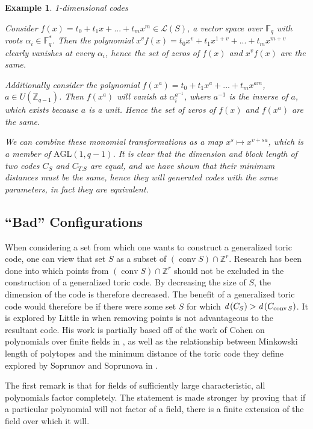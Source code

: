 \documentclass[12pt]{amsart}
\theoremstyle{plain}
\newtheorem{example}[Th]{Example}
\newcommand{\Int}{\mathbb{Z}}
\DeclareMathOperator{\Convex}{conv}
\newcommand{\dist}[1]{\mathrm{\emph{d}}\left(#1\right)}
\begin{document}
\begin{example}1-dimensional codes

Consider $f(x) = t_0 + t_1x + ... + t_m x^m \in \mathscr{L}(S)$, a vector space over $\mathbb{F}_q$ with roots $\alpha_i \in \mathbb{F}_q^*$. Then the polynomial $x^vf(x) = t_0 x^v + t_1 x^{1+v} + ... + t_m x^{m+v}$ clearly vanishes at every $\alpha_i$, hence the set of zeros of $f(x)$ and $x^v f(x)$ are the same.

Additionally consider the polynomial $f(x^a) = t_0 + t_1x^a + ... +t_mx^{am}$, $a \in U(\mathbb{Z}_{q-1})$. Then $f(x^a)$ will vanish at $\alpha_i^{a^{-1}}$, where $a^{-1}$ is the inverse of $a$, which exists because $a$ is a unit. Hence the set of zeros of $f(x)$ and $f(x^a)$ are the same.

We can combine these monomial transformations as a map $x^s \mapsto x^{v+sa}$, which is a member of $\mathrm{AGL}(1,q-1)$. It is clear that the dimension and block length of two codes $C_S$ and $C_{T.S}$ are equal, and we have shown that their minimum distances must be the same, hence they will generated codes with the same parameters, in fact they are equivalent.
\end{example}

\subsection{``Bad'' Configurations}
When considering a set from which one wants to construct a generalized toric code, one can view that set $S$ as a subset of $(\Convex S) \cap \Int^r$. Research has been done into which points from $(\Convex S) \cap \Int^r$ should not be excluded in the construction of a generalized toric code. By decreasing the size of $S$, the dimension of the code is therefore decreased. The benefit of a generalized toric code would therefore be if there were some set $S$ for which $\dist{C_S} > \dist{C_{\Convex S}}$.  It is explored by Little in \cite{little} when removing points is not advantageous to the resultant code. His work is partially based off of the work of Cohen on polynomials over finite fields in \cite{cohen}, as well as the relationship between Minkowski length of polytopes and the minimum distance of the toric code they define explored by Soprunov and Soprunova in \cite{is2}.

The first remark is that for fields of sufficiently large characteristic, all polynomials factor completely. The statement is made stronger by proving that if a particular polynomial will not factor of a field, there is a finite extension of the field over which it will.
\end{document}
